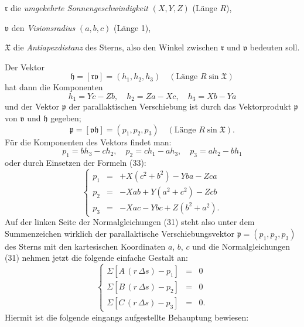 \documentclass[12pt,a4paper]{article}
\theoremstyle{plain}
\theoremstyle{definition}
\theoremstyle{remark}
\begin{document}
\begin{small}
$\mathfrak{r}$ die \textit{umgekehrte Sonnengeschwindigkeit} $(X, Y, Z)$ (L\"ange $R$),

$\mathfrak{v}$ den \textit{Visionsradius} $(a, b, c)$ (L\"ange 1),

$\mathfrak{X}$ die \textit{Antiapexdistanz} des Sterns, also den Winkel zwischen
$\mathfrak{r}$ und $\mathfrak{v}$ bedeuten soll.

Der Vektor
\begin{equation}\tag{32}
\mathfrak{h} = [\mathfrak{r}\mathfrak{v}] = (h_{1}, h_{2}, h_{3})\quad
(\text{L\"ange } R\sin\mathfrak{X})
\end{equation}
hat dann die Komponenten
\begin{equation}\tag{33}
h_{1} = Yc - Zb,\quad h_{2} = Za - Xc,\quad h_{3} = Xb - Ya
\end{equation}
und der Vektor $\mathfrak{p}$ der parallaktischen Verschiebung ist durch das Vektorprodukt
$\mathfrak{p}$ von $\mathfrak{v}$ und $\mathfrak{h}$ gegeben;
\begin{equation}\tag{34}
\mathfrak{p} = [\mathfrak{v}\mathfrak{h}] = (p_{1}, p_{2}, p_{3})\quad
(\text{L\"ange } R\sin\mathfrak{X}).
\end{equation}
F\"ur die Komponenten des Vektors findet man:
\begin{equation}\tag{35}
p_{1} = bh_{3} - ch_{2},\quad p_{2} = ch_{1} - ah_{3},\quad
p_{3} = ah_{2} - bh_{1}
\end{equation}
oder durch Einsetzen der Formeln (33):
\begin{equation}\tag{36}
\left\{\begin{array}{rcl}
p_{1} & = & +X(c^{2}+b^{2}) - Yba - Zca\\
p_{2} & = & -Xab + Y(a^{2}+c^{2}) - Zcb\\
p_{3} & = & -Xac - Ybc + Z(b^{2}+a^{2}).
\end{array}\right.\end{equation}
Auf der linken Seite der Normalgleichungen (31) steht also unter dem Summenzeichen
wirklich der parallaktische Verschiebungsvektor $\mathfrak{p} = (p_{1}, p_{2}, p_{3})$
des Sterns mit den kartesischen Koordinaten $a$, $b$, $c$ und die Normalgleichungen
(31) nehmen jetzt die folgende einfache Gestalt an:
\begin{equation}\tag{37}
\left\{\begin{array}{rcl}
\Sigma\left[A\,(r\,\Delta s) - p_{1}\right] & = & 0\\
\Sigma\left[B\,(r\,\Delta s) - p_{2}\right] & = & 0\\
\Sigma\left[C\,(r\,\Delta s) - p_{3}\right] & = & 0.
\end{array}\right.\end{equation}
Hiermit ist die folgende eingangs aufgestellte Behauptung bewiesen:


\end{small}
\end{document}
